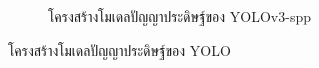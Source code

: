 \begin{figure}[!ht]
\begin{subfigure}[b]{0.5\textwidth}
	 \caption{โครงสร้างโมเดลปัญญาประดิษฐ์ของ YOLOv3-spp}
       \label{fig:spp}
    \end{subfigure}
    \caption{โครงสร้างโมเดลปัญญาประดิษฐ์ของ YOLO}
    \label{fig:yolo-architecture}
\end{figure}

